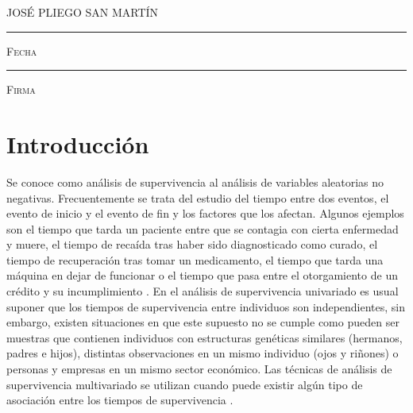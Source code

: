 \documentclass[11pt,a4paper]{article}
\begin{document}
\centering

\hspace{3em}

\textsc{JOSÉ PLIEGO SAN MARTÍN}

\vspace{5em}

\rule[1em]{20em}{0.5pt} %

\textsc{Fecha}
 
\vspace{8em}

\rule[1em]{20em}{0.5pt} %

\textsc{Firma}

\endgroup
\vspace*{\fill}

\newpage

\tableofcontents
\listoffigures
\listoftables

\newpage

\setlength{\parskip}{\baselineskip}

\section{Introducción}
\label{intro}

Se conoce como análisis de supervivencia al análisis de variables aleatorias no negativas. Frecuentemente se trata del estudio del tiempo entre dos eventos, el evento de inicio y el evento de fin y los factores que los afectan. Algunos ejemplos son el tiempo que tarda un paciente entre que se contagia con cierta enfermedad y muere, el tiempo de recaída tras haber sido diagnosticado como curado, el tiempo de recuperación tras tomar un medicamento, el tiempo que tarda una máquina en dejar de funcionar o el tiempo que pasa entre el otorgamiento de un crédito y su incumplimiento \citep{moore}. En el análisis de supervivencia univariado es usual suponer que los tiempos de supervivencia entre individuos son independientes, sin embargo, existen situaciones en que este supuesto no se cumple como pueden ser muestras que contienen individuos con estructuras genéticas similares (hermanos, padres e hijos), distintas observaciones en un mismo individuo (ojos y riñones) o personas y empresas en un mismo sector económico. Las técnicas de análisis de supervivencia multivariado se utilizan cuando puede existir algún tipo de asociación entre los tiempos de supervivencia \citep{klein}.
\end{document}
